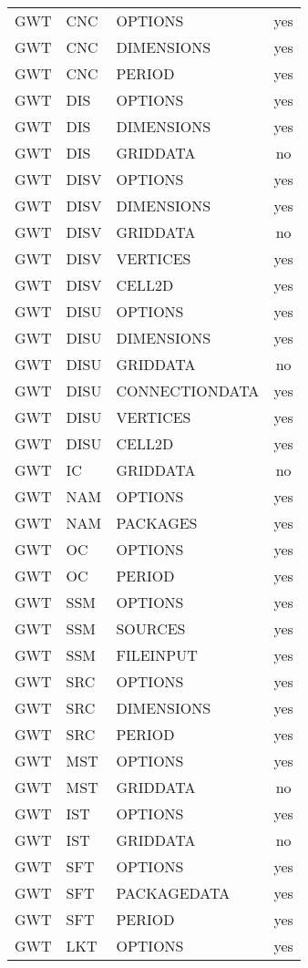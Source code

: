 \begin{longtable}{p{1.5cm} p{1.5cm} p{3cm} c}
\hline
GWT & CNC & OPTIONS & yes \\ 
GWT & CNC & DIMENSIONS & yes \\ 
GWT & CNC & PERIOD & yes \\ 
\hline
GWT & DIS & OPTIONS & yes \\ 
GWT & DIS & DIMENSIONS & yes \\ 
GWT & DIS & GRIDDATA & no \\ 
\hline
GWT & DISV & OPTIONS & yes \\ 
GWT & DISV & DIMENSIONS & yes \\ 
GWT & DISV & GRIDDATA & no \\ 
GWT & DISV & VERTICES & yes \\ 
GWT & DISV & CELL2D & yes \\ 
\hline
GWT & DISU & OPTIONS & yes \\ 
GWT & DISU & DIMENSIONS & yes \\ 
GWT & DISU & GRIDDATA & no \\ 
GWT & DISU & CONNECTIONDATA & yes \\ 
GWT & DISU & VERTICES & yes \\ 
GWT & DISU & CELL2D & yes \\ 
\hline
GWT & IC & GRIDDATA & no \\ 
\hline
GWT & NAM & OPTIONS & yes \\ 
GWT & NAM & PACKAGES & yes \\ 
\hline
GWT & OC & OPTIONS & yes \\ 
GWT & OC & PERIOD & yes \\ 
\hline
GWT & SSM & OPTIONS & yes \\ 
GWT & SSM & SOURCES & yes \\ 
GWT & SSM & FILEINPUT & yes \\ 
\hline
GWT & SRC & OPTIONS & yes \\ 
GWT & SRC & DIMENSIONS & yes \\ 
GWT & SRC & PERIOD & yes \\ 
\hline
GWT & MST & OPTIONS & yes \\ 
GWT & MST & GRIDDATA & no \\ 
\hline
GWT & IST & OPTIONS & yes \\ 
GWT & IST & GRIDDATA & no \\ 
\hline
GWT & SFT & OPTIONS & yes \\ 
GWT & SFT & PACKAGEDATA & yes \\ 
GWT & SFT & PERIOD & yes \\ 
\hline
GWT & LKT & OPTIONS & yes \\ 

\end{longtable}
